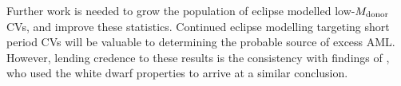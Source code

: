 Further work is needed to grow the population of eclipse modelled low-$M_{\rm donor}$ CVs, and improve these statistics.
Continued eclipse modelling targeting short period CVs will be valuable to determining the probable source of excess AML.
However, lending credence to these results is the consistency with findings of \citet{Pala2021}, who used the white dwarf properties to arrive at a similar conclusion.

















